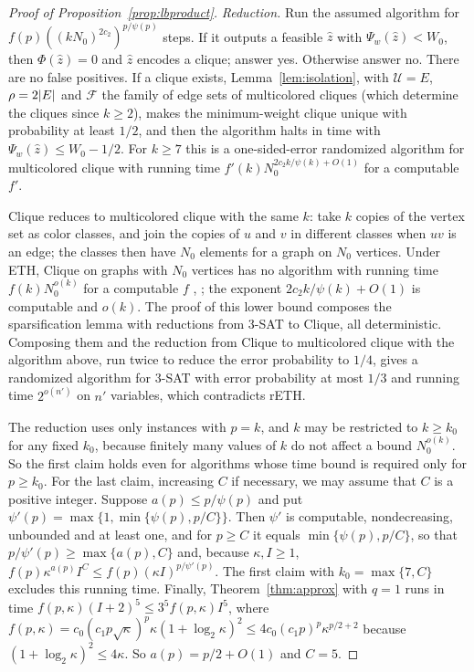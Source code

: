 \begin{proof}[Proof of Proposition~\ref{prop:lbproduct}]
\emph{Reduction.} Run the assumed algorithm for
$f(p)((kN_0)^{2c_2})^{p/\psi(p)}$ steps. If it outputs a feasible $\hat z$
with $\Psi_w(\hat z)<W_0$, then $\Phi(\hat z)=0$ and $\hat z$ encodes a
clique; answer yes. Otherwise answer no. There are no false positives. If a
clique exists, Lemma~\ref{lem:isolation}, with $\mathcal U=E$, $\rho=2\lvert E\rvert$
and $\mathcal F$ the family of edge sets of multicolored cliques (which
determine the cliques since $k\ge2$), makes the minimum-weight clique unique
with probability at least $1/2$, and then the algorithm halts in time with
$\Psi_w(\hat z)\le W_0-1/2$. For $k\ge7$ this is a one-sided-error randomized
algorithm for multicolored clique with running time
$f'(k)N_0^{2c_2k/\psi(k)+O(1)}$ for a computable $f'$.

Clique reduces to multicolored clique with the same $k$: take $k$ copies of
the vertex set as color classes, and join the copies of $u$ and $v$ in
different classes when $uv$ is an edge; the classes then have $N_0$ elements
for a graph on $N_0$ vertices. Under ETH, Clique on graphs with $N_0$ vertices
has no algorithm with running time $f(k)N_0^{o(k)}$ for a computable $f$
\cite{ChenEtAl2006}, \cite[Theorem~14.21]{CyganEtAl2015}; the exponent
$2c_2k/\psi(k)+O(1)$ is computable and $o(k)$. The proof of this lower bound
composes the sparsification lemma with reductions from 3-SAT to Clique, all
deterministic. Composing them and the reduction from Clique to multicolored
clique with the algorithm above, run twice to reduce the error probability
to $1/4$, gives a randomized algorithm for 3-SAT with error probability at
most $1/3$ and running time $2^{o(n')}$ on $n'$ variables, which contradicts
rETH.

The reduction uses only instances with $p=k$, and $k$ may be restricted to
$k\ge k_0$ for any fixed $k_0$, because finitely many values of $k$ do not
affect a bound $N_0^{o(k)}$. So the first claim holds even for algorithms whose
time bound is required only for $p\ge k_0$. For the last claim, increasing
$C$ if necessary, we may assume that $C$ is a positive integer. Suppose
$a(p)\le p/\psi(p)$ and put $\psi'(p)=\max\{1,\min\{\psi(p),p/C\}\}$. Then
$\psi'$ is computable, nondecreasing, unbounded and at least one, and for
$p\ge C$ it equals $\min\{\psi(p),p/C\}$, so that
$p/\psi'(p)\ge\max\{a(p),C\}$ and, because $\kappa,I\ge1$,
$f(p)\kappa^{a(p)}I^C\le f(p)(\kappa I)^{p/\psi'(p)}$. The first claim with
$k_0=\max\{7,C\}$ excludes this running time. Finally,
Theorem~\ref{thm:approx} with $q=1$ runs in time
$f(p,\kappa)(I+2)^5\le3^5f(p,\kappa)I^5$, where
$f(p,\kappa)=c_0(c_1p\sqrt\kappa)^p\kappa(1+\log_2\kappa)^2
\le4c_0(c_1p)^p\kappa^{p/2+2}$ because $(1+\log_2\kappa)^2\le4\kappa$. So
$a(p)=p/2+O(1)$ and $C=5$.
\end{proof}

